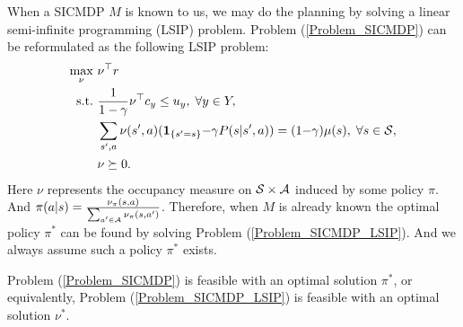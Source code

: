 When a SICMDP $M$ is known to us, we may do the planning by solving a linear semi-infinite programming (LSIP) problem.
Problem (\ref{Problem_SICMDP}) can be reformulated as the following LSIP problem:
\begingroup
\small
\begin{equation}\label{Problem_SICMDP_LSIP}
\begin{aligned}
\max_{\nu}\ &\nu^\top r \\
\text{s.t.}\ &\frac{1}{1-\gamma}\nu^\top c_y\leq u_y, \; \forall y\in Y, \\
& \sum_{s^\prime ,a}  \nu(s^\prime,a)(\mathbf{1}_{\{s^\prime=s\}} {-} \gamma P(s|s^\prime,a))=(1{-}\gamma)\mu(s), \; \forall s\in {\mathcal{S}}, \\
&\nu \succeq 0.
\end{aligned}
\end{equation}
\endgroup
Here $\nu$ represents the occupancy measure on ${\mathcal{S}}\times{\mathcal{A}}$ induced by some policy $\pi$.
And ${\pi(a|s)=\frac{\nu_\pi(s,a)}{\sum_{a^\prime\in {\mathcal{A}}}\nu_\pi(s,a^\prime)}}$.
Therefore, when $M$ is already known the optimal policy $\pi^*$ can be found by solving Problem (\ref{Problem_SICMDP_LSIP}).
And we always assume such a policy $\pi^*$ exists.
\begin{assumption}\label{Assumption_Feasible}
Problem (\ref{Problem_SICMDP}) is feasible with an optimal solution $\pi^*$, or equivalently, Problem (\ref{Problem_SICMDP_LSIP}) is feasible with an optimal solution $\nu^*$.
\end{assumption}